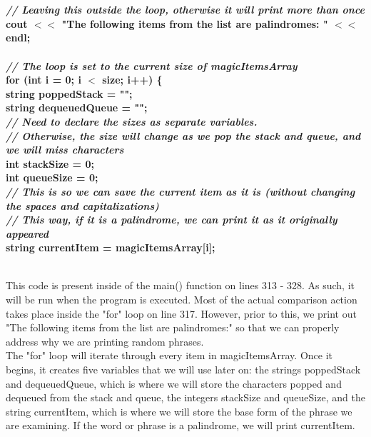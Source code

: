 \documentclass{article}
\begin{document}
\textbf{
\\~\\ \textit{ \indent // Leaving this outside the loop, otherwise it will print more than once\\ }
    \indent cout $<<$ "The following items from the list are palindromes: " $<<$ endl;\\
\\
    \textit{ \indent // The loop is set to the current size of magicItemsArray\\ }
    \indent for (int i = 0; i $<$ size; i++) \{\\
        \indent \indent string poppedStack = "";\\
        \indent \indent string dequeuedQueue = "";\\
        \textit{ \indent \indent // Need to declare the sizes as separate variables.\\
        \indent \indent // Otherwise, the size will change as we pop the stack and queue, and we will miss characters\\ }
        \indent \indent int stackSize = 0;\\
        \indent \indent int queueSize = 0;\\
        \textit{ \indent \indent // This is so we can save the current item as it is (without changing the spaces and capitalizations)\\
        \indent \indent // This way, if it is a palindrome, we can print it as it originally appeared\\ }
        \indent \indent string currentItem = magicItemsArray[i];\\~\\ }

This code is present inside of the main() function on lines 313 - 328. As such, it will be run when the program is executed. Most of the actual comparison action takes place inside the "for" loop on line 317. However, prior to this, we print out "The following items from the list are palindromes:" so that we can properly address why we are printing random phrases. \\
The "for" loop will iterate through every item in magicItemsArray. Once it begins, it creates five variables that we will use later on: the strings poppedStack and dequeuedQueue, which is where we will store the characters popped and dequeued from the stack and queue, the integers stackSize and queueSize, and the string currentItem, which is where we will store the base form of the phrase we are examining. If the word or phrase is a palindrome, we will print currentItem. 
\end{document}
